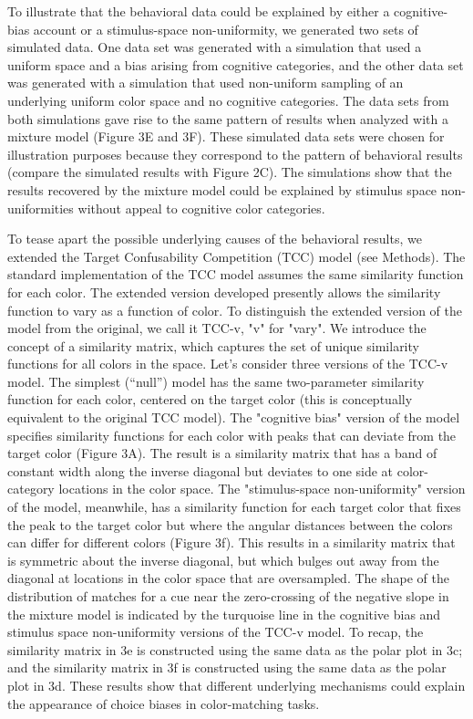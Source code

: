 To illustrate that the behavioral data could be explained by either a cognitive-bias account or a stimulus-space non-uniformity, we generated two sets of simulated data. 
One data set was generated with a simulation that used a uniform space and a bias arising from cognitive categories, and the other data set was generated with a simulation that used non-uniform sampling of an underlying uniform color space and no cognitive categories.
The data sets from both simulations gave rise to the same pattern of results when analyzed with a mixture model (Figure 3E and 3F).
These simulated data sets were chosen for illustration purposes because they correspond to the pattern of behavioral results (compare the simulated results with Figure 2C). 
The simulations show that the results recovered by the mixture model could be explained by stimulus space non-uniformities without appeal to cognitive color categories. 

To tease apart the possible underlying causes of the behavioral results, we extended the Target Confusability Competition (TCC) model \citep{schurgin_psychophysical_2020} (see Methods). 
The standard implementation of the TCC model assumes the same similarity function for each color. 
The extended version developed presently allows the similarity function to vary as a function of color. To distinguish the extended version of the model from the original, we call it TCC-v, "v" for "vary".
We introduce the concept of a similarity matrix, which captures the set of unique similarity functions for all colors in the space.
Let's consider three versions of the TCC-v model.
The simplest (“null”) model has the same two-parameter similarity function for each color, centered on the target color (this is conceptually equivalent to the original TCC model).  
The "cognitive bias" version of the model specifies similarity functions for each color with peaks that can deviate from the target color (Figure 3A). 
The result is a similarity matrix that has a band of constant width along the inverse diagonal but deviates to one side at color-category locations in the color space. 
The "stimulus-space non-uniformity" version of the model, meanwhile, has a similarity function for each target color that fixes the peak to the target color but where the angular distances between the colors can differ for different colors (Figure 3f). 
This results in a similarity matrix that is symmetric about the inverse diagonal, but which bulges out away from the diagonal at locations in the color space that are oversampled. 
The shape of the distribution of matches for a cue near the zero-crossing of the negative slope in the mixture model is indicated by the turquoise line in the cognitive bias and stimulus space non-uniformity versions of the TCC-v model. 
To recap, the similarity matrix in 3e is constructed using the same data as the polar plot in 3c; and the similarity matrix in 3f is constructed using the same data as the polar plot in 3d. 
These results show that different underlying mechanisms could explain the appearance of choice biases in color-matching tasks.

